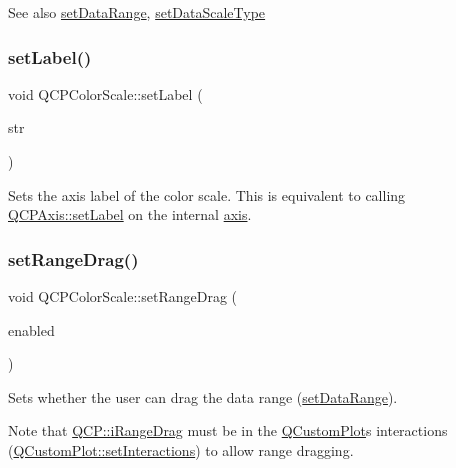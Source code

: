 \begin{DoxySeeAlso}{See also}
\hyperlink{class_q_c_p_color_scale_abe88633003a26d1e756aa74984587fef}{set\+Data\+Range}, \hyperlink{class_q_c_p_color_scale_aeb6107d67dd7325145b2498abae67fc3}{set\+Data\+Scale\+Type} 
\end{DoxySeeAlso}
\mbox{\label{class_q_c_p_color_scale_aee124ae8396320cacf8276e9a0fbb8ce}} 
\subsubsection{\texorpdfstring{set\+Label()}{setLabel()}}
{\footnotesize\ttfamily void Q\+C\+P\+Color\+Scale\+::set\+Label (\begin{DoxyParamCaption}\item[{const Q\+String \&}]{str }\end{DoxyParamCaption})}

Sets the axis label of the color scale. This is equivalent to calling \hyperlink{class_q_c_p_axis_a33bcc382c111c9f31bb0687352a2dea4}{Q\+C\+P\+Axis\+::set\+Label} on the internal \hyperlink{class_q_c_p_color_scale_a39bdbdb3b212602a5a57f9f3ea444190}{axis}. \mbox{\label{class_q_c_p_color_scale_a21c51a55e4fd581b6feadca9ee5b38d5}} 
\subsubsection{\texorpdfstring{set\+Range\+Drag()}{setRangeDrag()}}
{\footnotesize\ttfamily void Q\+C\+P\+Color\+Scale\+::set\+Range\+Drag (\begin{DoxyParamCaption}\item[{bool}]{enabled }\end{DoxyParamCaption})}

Sets whether the user can drag the data range (\hyperlink{class_q_c_p_color_scale_abe88633003a26d1e756aa74984587fef}{set\+Data\+Range}).

Note that \hyperlink{namespace_q_c_p_a2ad6bb6281c7c2d593d4277b44c2b037a2c4432b9aceafb94000be8d1b589ef18}{Q\+C\+P\+::i\+Range\+Drag} must be in the \hyperlink{class_q_custom_plot}{Q\+Custom\+Plot}\textquotesingle{}s interactions (\hyperlink{class_q_custom_plot_a5ee1e2f6ae27419deca53e75907c27e5}{Q\+Custom\+Plot\+::set\+Interactions}) to allow range dragging. \mbox{\label{class_q_c_p_color_scale_a96bd60fb6317ad6821841b539c93eeeb}} 
